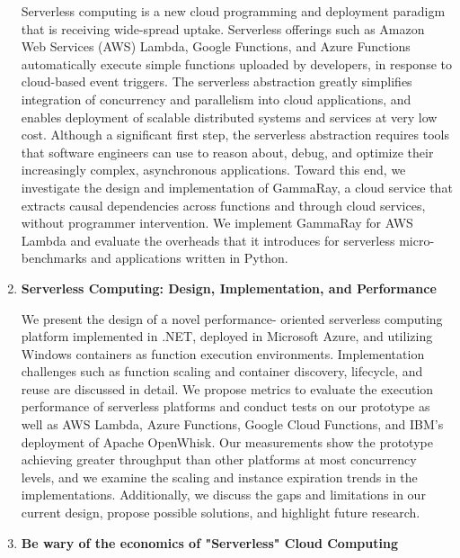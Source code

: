 \begin{enumerate}[wide, labelwidth=!, labelindent=0pt]
   Serverless computing is a new cloud programming and deployment paradigm that is receiving wide-spread uptake. Serverless offerings such as Amazon Web Services (AWS) Lambda, Google Functions, and Azure Functions automatically execute simple functions uploaded by developers, in response to cloud-based event triggers. The serverless abstraction greatly simplifies integration of concurrency and parallelism into cloud applications, and enables deployment of scalable distributed systems and services at very low cost. Although a significant first step, the serverless abstraction requires tools that software engineers can use to reason about, debug, and optimize their increasingly complex, asynchronous applications. Toward this end, we investigate the design and implementation of GammaRay, a cloud service that extracts causal dependencies across functions and through cloud services, without programmer intervention. We implement GammaRay for AWS Lambda and evaluate the overheads that it introduces for serverless micro-benchmarks and applications written in Python.     
    \item \textbf{Serverless Computing: Design, Implementation, and Performance} \cite{mcgrath2017serverless}
    
  We present the design of a novel performance- oriented serverless computing platform implemented in .NET, deployed in Microsoft Azure, and utilizing Windows containers as function execution environments. Implementation challenges such as function scaling and container discovery, lifecycle, and reuse are discussed in detail. We propose metrics to evaluate the execution performance of serverless platforms and conduct tests on our prototype as well as AWS Lambda, Azure Functions, Google Cloud Functions, and IBM’s deployment of Apache OpenWhisk. Our measurements show the prototype achieving greater throughput than other platforms at most concurrency levels, and we examine the scaling and instance expiration trends in the implementations. Additionally, we discuss the gaps and limitations in our current design, propose possible solutions, and highlight future research.     
    \item \textbf{Be wary of the economics of "Serverless" Cloud Computing} \cite{eivy2017wary}
    

\end{enumerate}
